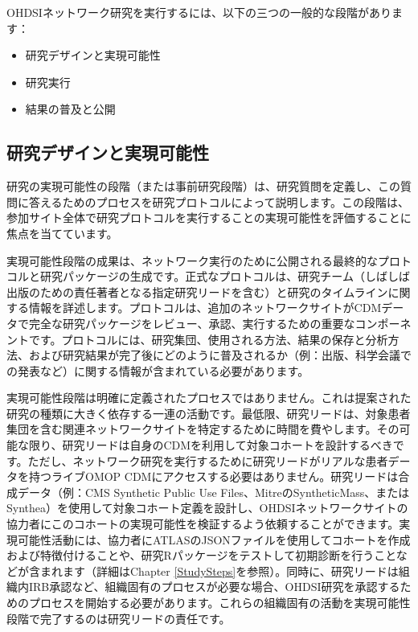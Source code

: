 \documentclass[
  11pt]{book}
\providecommand{\tightlist}{%
  \setlength{\itemsep}{0pt}\setlength{\parskip}{0pt}}
\theoremstyle{definition}
\theoremstyle{definition}
\theoremstyle{definition}
\theoremstyle{definition}
\theoremstyle{remark}
\begin{document}
OHDSIネットワーク研究を実行するには、以下の三つの一般的な段階があります：

\begin{itemize}
\tightlist
\item
  研究デザインと実現可能性
\item
  研究実行
\item
  結果の普及と公開
\end{itemize}

\subsection{研究デザインと実現可能性}\label{ux7814ux7a76ux30c7ux30b6ux30a4ux30f3ux3068ux5b9fux73feux53efux80fdux6027}

研究の実現可能性の段階（または事前研究段階）は、研究質問を定義し、この質問に答えるためのプロセスを研究プロトコルによって説明します。この段階は、参加サイト全体で研究プロトコルを実行することの実現可能性を評価することに焦点を当てています。

実現可能性段階の成果は、ネットワーク実行のために公開される最終的なプロトコルと研究パッケージの生成です。正式なプロトコルは、研究チーム（しばしば出版のための責任著者となる指定研究リードを含む）と研究のタイムラインに関する情報を詳述します。プロトコルは、追加のネットワークサイトがCDMデータで完全な研究パッケージをレビュー、承認、実行するための重要なコンポーネントです。プロトコルには、研究集団、使用される方法、結果の保存と分析方法、および研究結果が完了後にどのように普及されるか（例：出版、科学会議での発表など）に関する情報が含まれている必要があります。

実現可能性段階は明確に定義されたプロセスではありません。これは提案された研究の種類に大きく依存する一連の活動です。最低限、研究リードは、対象患者集団を含む関連ネットワークサイトを特定するために時間を費やします。その可能な限り、研究リードは自身のCDMを利用して対象コホートを設計するべきです。ただし、ネットワーク研究を実行するために研究リードがリアルな患者データを持つライブOMOP CDMにアクセスする必要はありません。研究リードは合成データ（例：CMS Synthetic Public Use Files、MitreのSyntheticMass、またはSynthea）を使用して対象コホート定義を設計し、OHDSIネットワークサイトの協力者にこのコホートの実現可能性を検証するよう依頼することができます。実現可能性活動には、協力者にATLASのJSONファイルを使用してコホートを作成および特徴付けることや、研究Rパッケージをテストして初期診断を行うことなどが含まれます（詳細はChapter \ref{StudySteps}を参照）。同時に、研究リードは組織内IRB承認など、組織固有のプロセスが必要な場合、OHDSI研究を承認するためのプロセスを開始する必要があります。これらの組織固有の活動を実現可能性段階で完了するのは研究リードの責任です。
\end{document}
